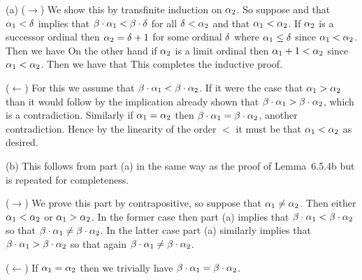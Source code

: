 \begin{solution}
	(a) ($\to$) We show this by transfinite induction on $\alpha_2$.
        So suppose and that  $\alpha_1 < \delta$ implies that $\beta \cdot \alpha_1 < \beta \cdot \delta$ for all $\delta < \alpha_2$ and that $\alpha_1 < \alpha_2$.
        If $\alpha_2$ is a successor ordinal then $\alpha_2 = \delta + 1$ for some ordinal $\delta$ where $\alpha_1 \leq \delta$ since $\alpha_1 < \alpha_2$.
        Then we have
        On the other hand if $\alpha_2$ is a limit ordinal then $\alpha_1 + 1 < \alpha_2$ since $\alpha_1 < \alpha_2$.
        Then we have that
        This completes the inductive proof.

        ($\leftarrow$) For this we assume that $\beta \cdot \alpha_1 < \beta \cdot \alpha_2$.
        If it were the case that $\alpha_1 > \alpha_2$ than it would follow by the implication already shown that $\beta \cdot \alpha_1 > \beta \cdot \alpha_2$, which is a contradiction.
        Similarly if $\alpha_1 = \alpha_2$ then $\beta \cdot \alpha_1 = \beta \cdot \alpha_2$, another contradiction.
        Hence by the linearity of the order $<$ it must be that $\alpha_1 < \alpha_2$ as desired. \qedsymbol

    (b) This follows from part (a) in the same way as the proof of Lemma~6.5.4b but is repeated for completeness.

    ($\to$) We prove this part by contrapositive, so suppose that $\alpha_1 \neq \alpha_2$.
    Then either $\alpha_1 < \alpha_2$ or $\alpha_1 > \alpha_2$.
    In the former case then part (a) implies that $\beta \cdot \alpha_1 < \beta \cdot \alpha_2$ so that $\beta \cdot \alpha_1 \neq \beta \cdot \alpha_2$.
    In the latter case part (a) similarly implies that $\beta \cdot \alpha_1 > \beta \cdot \alpha_2$ so that again $\beta \cdot \alpha_1 \neq \beta \cdot \alpha_2$.

    ($\leftarrow$) If $\alpha_1 = \alpha_2$ then we trivially have $\beta \cdot \alpha_1 = \beta \cdot \alpha_2$. \qedsymbol
\end{solution}


